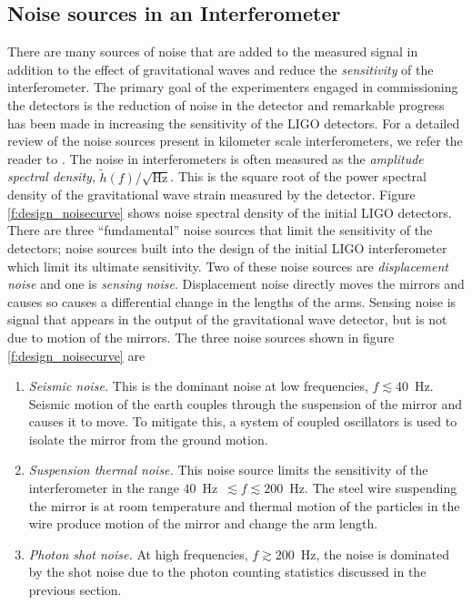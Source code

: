 \subsection{Noise sources in an Interferometer}
\label{ss:noise}

There are many sources of noise that are added to the measured signal in
addition to the effect of gravitational waves and reduce the
\emph{sensitivity} of the interferometer. The primary goal of the
experimenters engaged in commissioning the detectors is the reduction of noise
in the detector and remarkable progress has been made in increasing the
sensitivity of the LIGO detectors.  For a detailed review of the noise sources
present in kilometer scale interferometers, we refer the reader to
\cite{Adhikari:thesis}. The noise in interferometers is often measured as the
\emph{amplitude spectral density}, $\tilde{h}(f) / \sqrt{\mathrm{Hz}}$. This
is the square root of the power spectral density of the gravitational wave
strain measured by the detector.  Figure \ref{f:design_noisecurve} shows noise
spectral density of the initial LIGO detectors. There are three
``fundamental'' noise sources that limit the sensitivity of the 
detectors; noise sources built into the design of the initial LIGO
interferometer which limit its ultimate sensitivity.  Two of these noise sources are
\emph{displacement noise} and one is \emph{sensing noise}.
Displacement noise directly moves the mirrors and causes so causes a
differential change in the lengths of the arms.  Sensing noise is signal that
appears in the output of the gravitational wave detector, but is not due to
motion of the mirrors.  The three noise sources shown in figure
\ref{f:design_noisecurve} are
\begin{enumerate}
\item \emph{Seismic noise.} This is the dominant noise at low frequencies, $f
\lesssim 40$~Hz.  Seismic motion of the earth couples through the suspension
of the mirror and causes it to move. To mitigate this, a system of coupled
oscillators is used to isolate the mirror from the ground motion. 

\item \emph{Suspension thermal noise.} This noise source limits the
sensitivity of the interferometer in the range $40$~Hz~$\lesssim f \lesssim
200$~Hz. The steel wire suspending the mirror is at room temperature and
thermal motion of the particles in the wire produce motion of the mirror and
change the arm length.

\item \emph{Photon shot noise.} At high frequencies, $f \gtrsim 200$~Hz, the
noise is dominated by the shot noise due to the photon counting statistics
discussed in the previous section.
\end{enumerate}

